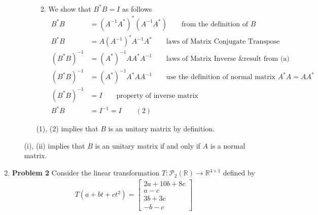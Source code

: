 \documentclass{uofa-eng-assignment}
\begin{document}
\begin{enumerate}
\begin{enumerate}
\begin{enumerate}
\begin{enumerate}[(*)]
\begin{align*}
	      	      	      \end{align*}
                                    \item We show that $B^*B = I$ as follows
	      	      	      \begin{align*}
	      	      	      	B^*B        & = (A^{-1}A^*)^*(A^{-1}A^*) \qquad \text{from the definition of $B$}            \\
	      	      	      	B^*B        & = A(A^{-1})^*A^{-1}A^* \qquad \text{laws of Matrix Conjugate Transpose}        \\
	      	      	      	(B^*B)^{-1} & = (A^*)^{-1}AA^*A^{-1} \qquad \text{laws of Matrix Inverse \& result from (a)} \\
	      	      	      	(B^*B)^{-1} & = (A^*)^{-1}A^*AA^{-1}  \qquad \text{use the definition of normal matrix } A^*A = AA^*             \\
	      	      	      	(B^*B)^{-1} & = I            \qquad \text{property of inverse matrix}                                                                \\
	      	      	      	B^*B        & = I^{-1} = I \qquad (2)                                                        
	      	      	      \end{align*}    
                                \end{enumerate}
	      	      	      (1), (2) implies that $B$ is an unitary matrix by definition.
	      	      \end{enumerate}
	      	      (i), (ii) implies that $B$ is an unitary matrix if and only if $A$ is a normal matrix.
	      \end{enumerate}
	\item[] \textbf{Problem 2} \newline
	      Consider the linear transformation $T: \mathcal{P}_2(\mathbb{R})\xrightarrow{} \mathbb{R}^{4\times 1}$ defined by
	      \begin{align*}
	      	T(a + bt + ct^2) = \begin{bmatrix} 
	      	2a + 10b + 8c                      \\
	      	a - c                              \\
	      	3b + 3c                            \\
	      	-b - c                             
	      	\end{bmatrix}                      
	      \end{align*}

\end{enumerate}
\end{document}
